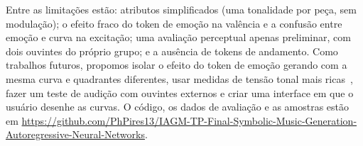 \documentclass{article}
\newcommand{\repo}{\url{https://github.com/PhPires13/IAGM-TP-Final-Symbolic-Music-Generation-Autoregressive-Neural-Networks}}
\begin{document}
Entre as limitações estão: atributos simplificados (uma tonalidade por peça, sem modulação); o efeito fraco do token de emoção na valência e a confusão entre emoção e curva na excitação; uma avaliação perceptual apenas preliminar, com dois ouvintes do próprio grupo; e a ausência de tokens de andamento. Como trabalhos futuros, propomos isolar o efeito do token de emoção gerando com a mesma curva e quadrantes diferentes, usar medidas de tensão tonal mais ricas~\cite{herremans2016tension}, fazer um teste de audição com ouvintes externos e criar uma interface em que o usuário desenhe as curvas. O código, os dados de avaliação e as amostras estão em \repo.


\end{document}
